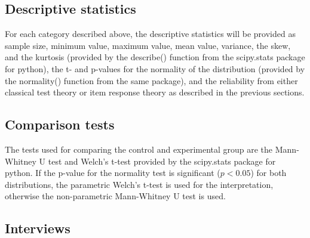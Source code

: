 \subsection{Descriptive statistics}

For each category described above, the descriptive statistics will be provided as sample size, minimum value, maximum value, mean value, variance, the skew, and the kurtosis (provided by the describe() function from the scipy.stats package for python), the t- and p-values for the normality of the distribution (provided by the normality() function from the same package), and the reliability from either classical test theory or item response theory as described in the previous sections.

\subsection{Comparison tests}

The tests used for comparing the control and experimental group are the Mann-Whitney U test and Welch's t-test provided by the scipy.stats package for python. If the p-value for the normality test is significant ($p<0.05$) for both distributions, the parametric Welch's t-test is used for the interpretation, otherwise the non-parametric Mann-Whitney U test is used.

\subsection{Interviews}
